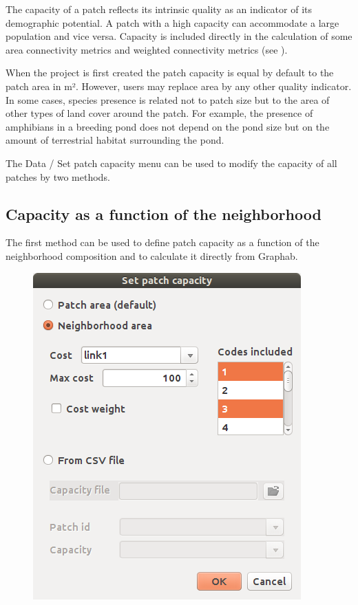 \documentclass{article}
\begin{document}
The capacity of a patch reflects its intrinsic quality as an indicator of its demographic potential. A patch with a high capacity can accommodate a large population and vice versa. Capacity is included directly in the calculation of some area connectivity metrics and weighted connectivity metrics (see ).

When the project is first created the patch capacity is equal by default to the patch area in m². However, users may replace area by any other quality indicator. In some cases, species presence is related not to patch size but to the area of other types of land cover around the patch. For example, the presence of amphibians in a breeding pond does not depend on the pond size but on the amount of terrestrial habitat
surrounding the pond.

The Data / Set patch capacity menu can be used to modify the capacity of all patches by two methods.

\subsection{Capacity as a function of the neighborhood}

The first method can be used to define patch capacity as a function of the neighborhood composition and to calculate it directly from Graphab. 

\begin{figure}[H]
	\includegraphics[scale=0.5]{img/manual-en_img8.png}
\end{figure}
\end{document}

